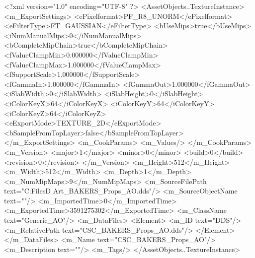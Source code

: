 <?xml version="1.0" encoding="UTF-8" ?>
<AssetObjects..TextureInstance>
	<m_ExportSettings>
		<ePixelformat>PF_R8_UNORM</ePixelformat>
		<eFilterType>FT_GAUSSIAN</eFilterType>
		<bUseMips>true</bUseMips>
		<iNumManualMips>0</iNumManualMips>
		<bCompleteMipChain>true</bCompleteMipChain>
		<fValueClampMin>0.000000</fValueClampMin>
		<fValueClampMax>1.000000</fValueClampMax>
		<fSupportScale>1.000000</fSupportScale>
		<fGammaIn>1.000000</fGammaIn>
		<fGammaOut>1.000000</fGammaOut>
		<iSlabWidth>0</iSlabWidth>
		<iSlabHeight>0</iSlabHeight>
		<iColorKeyX>64</iColorKeyX>
		<iColorKeyY>64</iColorKeyY>
		<iColorKeyZ>64</iColorKeyZ>
		<eExportMode>TEXTURE_2D</eExportMode>
		<bSampleFromTopLayer>false</bSampleFromTopLayer>
	</m_ExportSettings>
	<m_CookParams>
		<m_Values/>
	</m_CookParams>
	<m_Version>
		<major>1</major>
		<minor>0</minor>
		<build>0</build>
		<revision>0</revision>
	</m_Version>
	<m_Height>512</m_Height>
	<m_Width>512</m_Width>
	<m_Depth>1</m_Depth>
	<m_NumMipMaps>9</m_NumMipMaps>
	<m_SourceFilePath text="C:\Users\Shadow\Desktop\Working Files\3D Art\Props\Bakers\CSC_BAKERS_Props_AO.dds"/>
	<m_SourceObjectName text=""/>
	<m_ImportedTime>0</m_ImportedTime>
	<m_ExportedTime>3591275302</m_ExportedTime>
	<m_ClassName text="Generic_AO"/>
	<m_DataFiles>
		<Element>
			<m_ID text="DDS"/>
			<m_RelativePath text="CSC_BAKERS_Props_AO.dds"/>
		</Element>
	</m_DataFiles>
	<m_Name text="CSC_BAKERS_Props_AO"/>
	<m_Description text=""/>
	<m_Tags/>
</AssetObjects..TextureInstance>

